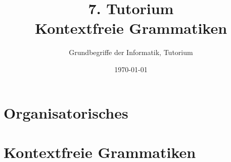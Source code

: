 




\title[Grammatiken]{7. Tutorium\\Kontextfreie Grammatiken}
\subtitle{Grundbegriffe der Informatik, Tutorium \hashtag\mytutnumber}
\date{\today}


\titleframe
\roadmap


\section{Organisatorisches}


\section{Kontextfreie Grammatiken}



\section{}
\questionframe
\lastframe
{}
